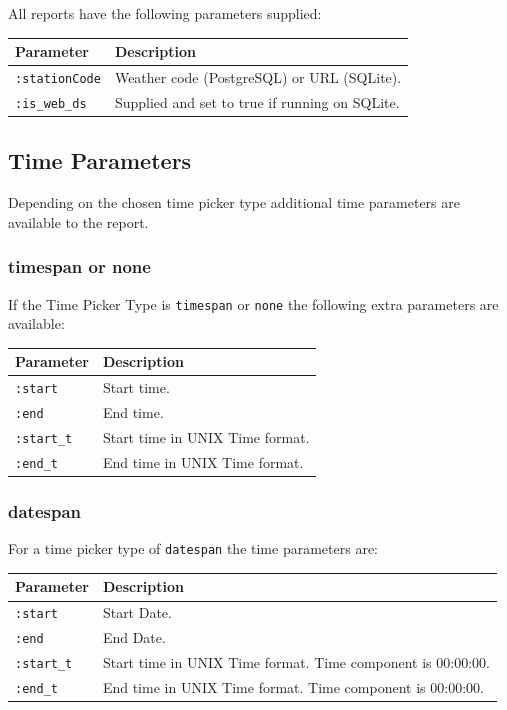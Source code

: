 \documentclass[a4paper,10pt]{book}
\begin{document}
All reports have the following parameters supplied:

\begin{tabular}{p{2.5cm} l}
\hline
\textbf{Parameter} & \textbf{Description} \\
\hline
\verb|:stationCode| & Weather code (PostgreSQL) or URL (SQLite).\\
\verb|:is_web_ds| & Supplied and set to true if running on SQLite.\\
\hline
\end{tabular}

\subsection{Time Parameters}
Depending on the chosen time picker type additional time parameters are available to the report.

\subsubsection{timespan or none}
If the Time Picker Type is \verb|timespan| or \verb|none| the following extra parameters are available:

\begin{tabular}{p{2.5cm} l}
\hline
\textbf{Parameter} & \textbf{Description} \\
\hline
\verb|:start| & Start time.\\
\verb|:end| & End time.\\
\verb|:start_t| & Start time in UNIX Time format.\\
\verb|:end_t| & End time in UNIX Time format.\\
\hline
\end{tabular}

\subsubsection{datespan}
For a time picker type of \verb|datespan| the time parameters are:

\begin{tabular}{p{2.5cm} l}
\hline
\textbf{Parameter} & \textbf{Description} \\
\hline
\verb|:start| & Start Date.\\
\verb|:end| & End Date.\\
\verb|:start_t| & Start time in UNIX Time format. Time component is 00:00:00.\\
\verb|:end_t| & End time in UNIX Time format. Time component is 00:00:00.\\
\hline
\end{tabular}
\end{document}
